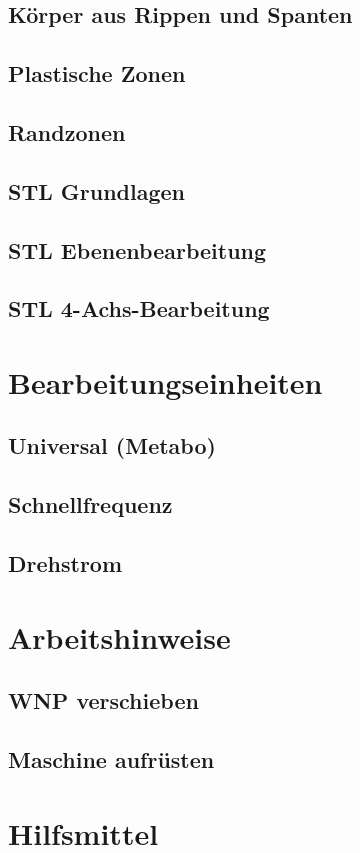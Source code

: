 \documentclass[14pt,a4paper]{book}
\begin{document}
		\subsection{Körper aus Rippen und Spanten} 
		\subsection{Plastische Zonen} 
		\subsection{Randzonen} 
		\subsection{STL Grundlagen} 
		\subsection{STL Ebenenbearbeitung} 
		\subsection{STL 4-Achs-Bearbeitung}
	\section{Bearbeitungseinheiten} 
		\subsection{Universal (Metabo)} 
		\subsection{Schnellfrequenz} 
		\subsection{Drehstrom} 	 
	\section{Arbeitshinweise}
		\subsection{WNP verschieben} 
		\subsection{Maschine aufrüsten}
	\section{Hilfsmittel} 
\end{document}
